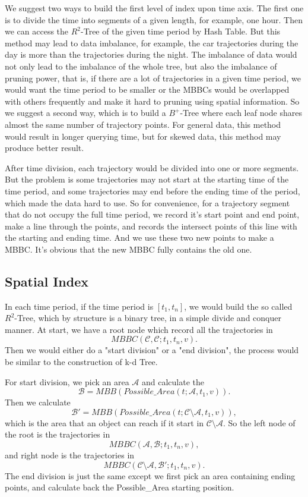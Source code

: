 \documentclass[sigplan]{acmart}
\begin{document}
We suggest two ways to build the first level of index upon time axis. The first one is to divide the time into segments of a given length, for example, one hour. Then we can access the $R^2$-Tree of the given time period by Hash Table. But this method may lead to data imbalance, for example, the car trajectories during the day is more than the trajectories during the night. The imbalance of data would not only lead to the imbalance of the whole tree, but also the imbalance of pruning power, that is, if there are a lot of trajectories in a given time period, we would want the time period to be smaller or the MBBCs would be overlapped with others frequently and make it hard to pruning using spatial information. So we suggest a second way, which is to build a $B^+ $-Tree where each leaf node shares almost the same number of trajectory points. For general data, this method would result in longer querying time, but for skewed data, this method may produce better result.\par

After time division, each trajectory would be divided into one or more segments. But the problem is some trajectories may not start at the starting time of the time period, and some trajectories may end before the ending time of the period, which made the data hard to use. So for convenience, for a trajectory segment that do not occupy the full time period, we record it's start point and end point, make a line through the points, and records the intersect points of this line with the starting and ending time. And we use these two new points to make a MBBC. It's obvious that the new MBBC fully contains the old one.

\subsection{Spatial Index}
In each time period, if the time period is $[t_1, t_n]$, we would build the so called $R^2$-Tree, which by structure is a binary tree, in a simple divide and conquer manner. At start, we have a root node which record all the trajectories in $$MBBC(\mathcal{C}, \mathcal{C};t_1, t_n, v).$$ Then we would either do a "start division" or a "end division", the process would be similar to the construction of k-d Tree.\par

For start division, we pick an area $\mathcal{A}$ and calculate the $$\mathcal{B}=MBB(Possible\_Area(t;\mathcal{A}, t_1, v)).$$
Then we calculate $$\mathcal{B'}=MBB(Possible\_Area(t;\mathcal{C} \setminus \mathcal{A}, t_1, v)), $$
which is the area that an object can reach if it start in $\mathcal{C}\setminus \mathcal{A}$. So the left node of the root is the trajectories in $$MBBC(\mathcal{A}, \mathcal{B};t_1, t_n, v), $$ and right node is the trajectories in $$MBBC(\mathcal{C}\setminus \mathcal{A}, \mathcal{B'};t_1, t_n, v).$$ The end division is just the same except we first pick an area containing ending points, and calculate back the Possible\_Area starting position.\par
\end{document}
